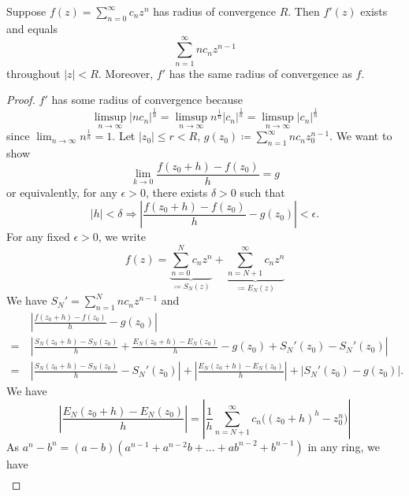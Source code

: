 \documentclass[11pt]{article}
\begin{document}
\begin{theorem}
	Suppose $f(z) = \sum^\infty_{n=0}c_nz^n$ has radius of
	convergence $R$. Then $f'(z)$ exists and equals
	\begin{equation*}
		\sum^{\infty}_{n=1} nc_nz^{n-1}
	\end{equation*}
	throughout $|z| < R$. Moreover, $f'$ has the same radius of convergence as
	$f$.
	\label{theorem4}
\end{theorem}
\begin{proof}
	$f'$ has some radius of convergence because
	\begin{equation*}
		\limsup_{n\to\infty}|nc_n|^{\frac{1}{n}}
		= \limsup_{n\to\infty}n^{\frac{1}{n}}|c_n|^{\frac{1}{n}}
		= \limsup_{n\to\infty}|c_n|^{\frac{1}{n}}
	\end{equation*}
	since $\displaystyle\lim_{n\to\infty}n^{\frac{1}{n}} = 1$. Let $|z_0| \leq r
	< R$, $\displaystyle g(z_0) \coloneqq \sum^\infty_{n=1} nc_nz_0^{n-1}$. We
	want to show
	\begin{equation*}
		\lim_{k\to 0} \frac{f(z_0+h)-f(z_0)}{h} = g
	\end{equation*}
	or equivalently, for any $\epsilon > 0$, there exists $\delta > 0$ such that
	\begin{equation*}
		|h| < \delta \Rightarrow \left|\frac{f(z_0+h)-f(z_0)}{h} -
		g(z_0)\right| < \epsilon.
	\end{equation*}
	For any fixed $\epsilon > 0$, we write
	\begin{equation*}
		f(z) = \underbrace{\sum^N_{n=0}c_nz^n}_{\coloneqq S_N(z)} +
		\underbrace{\sum^\infty_{n=N+1}c_nz^n}_{\coloneqq E_N(z)}
	\end{equation*}
	We have $S_N' = \sum^N_{n=1}nc_nz^{n-1}$ and
	\begin{align*}
		&\>\left|\frac{f(z_0+h)-f(z_0)}{h}-g(z_0)\right|\\
		=&\> \left|\frac{S_N(z_0+h)-S_N(z_0)}{h}+\frac{E_N(z_0+h) -
		E_N(z_0)}{h}-g(z_0)+S_N'(z_0) -S_N'(z_0)\right|\\
		=&\> \left|\frac{S_N(z_0+h)-S_N(z_0)}{h}-S_N'(z_0) \right|
		+ \left|\frac{E_N(z_0+h)-E_N(z_0)}{h}\right|+\left|S_N'(z_0) -
		g(z_0)\right|.
	\end{align*}
	We have
	\begin{equation*}
		\left|\frac{E_N(z_0+h)-E_N(z_0)}{h}\right| = \left|\frac{1}{h}
		\sum^\infty_{n=N+1}c_n \big((z_0+h)^h -z_0^n\big)\right|
	\end{equation*}
	As $a^n -b^n = (a-b)(a^{n-1}+a^{n-2}b+\dots+ab^{n-2}+b^{n-1})$ in any
	ring, we have
	\begin{align*}

\end{align*}
\end{proof}
\end{document}
